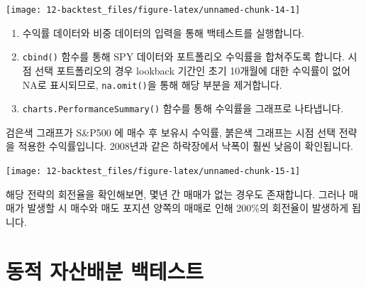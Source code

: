 \documentclass[12pt,]{book}
\newenvironment{Shaded}{\begin{snugshade}}{\end{snugshade}}
\newcommand{\DataTypeTok}[1]{\textcolor[rgb]{0.13,0.29,0.53}{#1}}
\newcommand{\KeywordTok}[1]{\textcolor[rgb]{0.13,0.29,0.53}{\textbf{#1}}}
\newcommand{\NormalTok}[1]{#1}
\newcommand{\OperatorTok}[1]{\textcolor[rgb]{0.81,0.36,0.00}{\textbf{#1}}}
\newcommand{\OtherTok}[1]{\textcolor[rgb]{0.56,0.35,0.01}{#1}}
\newcommand{\StringTok}[1]{\textcolor[rgb]{0.31,0.60,0.02}{#1}}
\providecommand{\tightlist}{%
  \setlength{\itemsep}{0pt}\setlength{\parskip}{0pt}}
\begin{document}
\begin{center}\texttt{[image: 12-backtest\_files/figure-latex/unnamed-chunk-14-1]} \end{center}

\begin{enumerate}
\def\labelenumi{\arabic{enumi}.}
\tightlist
\item
  수익률 데이터와 비중 데이터의 입력을 통해 백테스트를 실행합니다.
\item
  \texttt{cbind()} 함수를 통해 SPY 데이터와 포트폴리오 수익률을 합쳐주도록 합니다. 시점 선택 포트폴리오의 경우 lookback 기간인 초기 10개월에 대한 수익률이 없어 NA로 표시되므로, \texttt{na.omit()}을 통해 해당 부분을 제거합니다.
\item
  \texttt{charts.PerformanceSummary()} 함수를 통해 수익률을 그래프로 나타냅니다.
\end{enumerate}

검은색 그래프가 S\&P500 에 매수 후 보유시 수익률, 붉은색 그래프는 시점 선택 전략을 적용한 수익률입니다. 2008년과 같은 하락장에서 낙폭이 훨씬 낮음이 확인됩니다.

\begin{Shaded}
\end{Shaded}

\begin{center}\texttt{[image: 12-backtest\_files/figure-latex/unnamed-chunk-15-1]} \end{center}

해당 전략의 회전율을 확인해보면, 몇년 간 매매가 없는 경우도 존재합니다. 그러나 매매가 발생할 시 매수와 매도 포지션 양쪽의 매매로 인해 200\%의 회전율이 발생하게 됩니다.

\hypertarget{section-84}{%
\section{동적 자산배분 백테스트}\label{section-84}}
\end{document}

